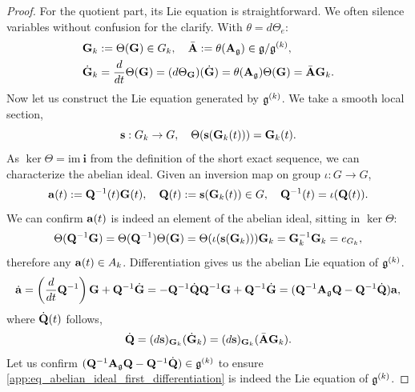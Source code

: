 \begin{proof}
    For the quotient part, its Lie equation is straightforward.
    We often silence variables without confusion for the clarify.
    With $\theta = d\Theta_e$:
    \begin{align}
        \mathbf{G}_k &:= \Theta(\mathbf{G}) \in G_k,
        \quad
        \bar{\mathbf{A}} := \theta(\mathbf{A}_{\mathfrak{g}}) \in \mathfrak{g} / \mathfrak{g}^{(k)}, \nonumber
        \\
        \dot{\mathbf{G}}_k
        &=
        \frac{d}{dt}\Theta(\mathbf{G})
        =
        (d\Theta_{\mathbf{G}})(\dot{\mathbf{G}})
        =
        \theta(\mathbf{A}_{\mathfrak{g}})\Theta(\mathbf{G})
        =
        \bar{\mathbf{A}}\mathbf{G}_k. \label{app:eq_quotient_LieEquation}
    \end{align}
    Now let us construct the Lie equation generated by $\mathfrak{g}^{(k)}$. We take a smooth local section,
    \begin{equation*}
        \mathbf{s}: G_k \to G,
        \quad
        \Theta(\mathbf{s}(\mathbf{G}_k(t))) = \mathbf{G}_k(t).
    \end{equation*}
    As $\ker \Theta = \text{im} \: \boldsymbol i$ from the definition of the short exact sequence,
    we can characterize the abelian ideal.
    Given an inversion map on group $\iota: G \to G$,
    \begin{equation}
    \label{app:eq_abelian_ideal_LieEquation}
        \mathbf{a}(t) := \mathbf{Q}^{-1}(t)\mathbf{G}(t),
        \quad
        \mathbf{Q}(t) := \mathbf{s}(\mathbf{G}_k(t)) \in G,
        \quad
        \mathbf{Q}^{-1}(t) = \iota(\mathbf{Q}(t)).
    \end{equation}
    We can confirm $\mathbf{a}(t)$ is indeed an element of the abelian ideal, sitting in $\ker \Theta$:
    \begin{equation*}
        \Theta(\mathbf{Q}^{-1}\mathbf{G}) = \Theta(\mathbf{Q}^{-1})\Theta(\mathbf{G}) = \Theta(\iota(\mathbf{s}(\mathbf{G}_k)))\mathbf{G}_k = \mathbf{G}_k^{-1}\mathbf{G}_k = e_{G_k},
    \end{equation*}
    therefore any $\mathbf{a}(t) \in A_k$.
    Differentiation gives us the abelian Lie equation of $\mathfrak{g}^{(k)}$.
    \begin{equation}
    \label{app:eq_abelian_ideal_first_differentiation}
        \dot{\mathbf{a}} = \left(\frac{d}{dt} \mathbf{Q}^{-1} \right)\mathbf{G} + \mathbf{Q}^{-1}\dot{\mathbf{G}}
        = -\mathbf{Q}^{-1}\dot{\mathbf{Q}}\mathbf{Q}^{-1}\mathbf{G} + \mathbf{Q}^{-1}\dot{\mathbf{G}}
        = (\mathbf{Q}^{-1}\mathbf{A}_{\mathfrak{g}}\mathbf{Q}-\mathbf{Q}^{-1}\dot{\mathbf{Q}})\mathbf{a},
    \end{equation}
    where $\dot{\mathbf{Q}}(t)$ follows,
    \begin{equation*}
        \dot{\mathbf{Q}} = (d\mathbf{s})_{\mathbf{G}_k}(\dot{\mathbf{G}}_k) = (d\mathbf{s})_{\mathbf{G}_k}(\bar{\mathbf{A}}\mathbf{G}_k).
    \end{equation*}
    Let us confirm $(\mathbf{Q}^{-1}\mathbf{A}_{\mathfrak{g}}\mathbf{Q}-\mathbf{Q}^{-1}\dot{\mathbf{Q}}) \in \mathfrak{g}^{(k)}$
    to ensure \cref{app:eq_abelian_ideal_first_differentiation} is indeed the Lie equation of $\mathfrak{g}^{(k)}$.
    

\end{proof}
